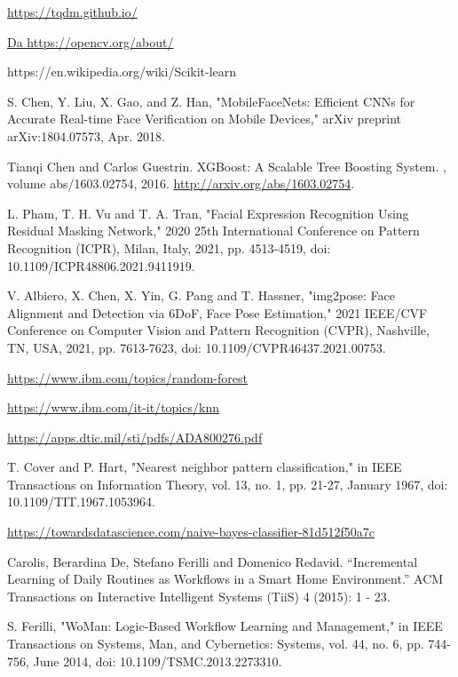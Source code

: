 \begin{thebibliography}{9}
     \url{https://tqdm.github.io/}
    
     \url{Da https://opencv.org/about/}
    
     {https://en.wikipedia.org/wiki/Scikit-learn}
    
     S. Chen, Y. Liu, X. Gao, and Z. Han, "MobileFaceNets: Efficient CNNs for Accurate Real-time Face Verification on Mobile Devices," arXiv preprint arXiv:1804.07573, Apr. 2018.
    
    Tianqi Chen and Carlos Guestrin.
    \newblock XGBoost: {A} Scalable Tree Boosting System.
    , volume abs/1603.02754, 2016.
    \newblock \url{http://arxiv.org/abs/1603.02754}.
    
    L. Pham, T. H. Vu and T. A. Tran, "Facial Expression Recognition Using Residual Masking Network," 2020 25th International Conference on Pattern Recognition (ICPR), Milan, Italy, 2021, pp. 4513-4519, doi: 10.1109/ICPR48806.2021.9411919.
    
    V. Albiero, X. Chen, X. Yin, G. Pang and T. Hassner, "img2pose: Face Alignment and Detection via 6DoF, Face Pose Estimation," 2021 IEEE/CVF Conference on Computer Vision and Pattern Recognition (CVPR), Nashville, TN, USA, 2021, pp. 7613-7623, doi: 10.1109/CVPR46437.2021.00753.
    
     \url{https://www.ibm.com/topics/random-forest}
    
     \url{https://www.ibm.com/it-it/topics/knn}
    
     \url{https://apps.dtic.mil/sti/pdfs/ADA800276.pdf}
    
    T. Cover and P. Hart, "Nearest neighbor pattern classification," in IEEE Transactions on Information Theory, vol. 13, no. 1, pp. 21-27, January 1967, doi: 10.1109/TIT.1967.1053964.
    
     \url{https://towardsdatascience.com/naive-bayes-classifier-81d512f50a7c}

     Carolis, Berardina De, Stefano Ferilli and Domenico Redavid. “Incremental Learning of Daily Routines as Workflows in a Smart Home Environment.” ACM Transactions on Interactive Intelligent Systems (TiiS) 4 (2015): 1 - 23.

    S. Ferilli, "WoMan: Logic-Based Workflow Learning and Management," in IEEE Transactions on Systems, Man, and Cybernetics: Systems, vol. 44, no. 6, pp. 744-756, June 2014, doi: 10.1109/TSMC.2013.2273310.
\end{thebibliography}
